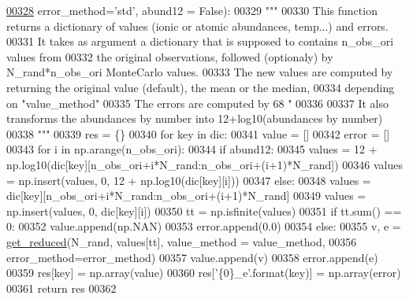 \begin{DoxyCode}
\hypertarget{namespacepyneb_1_1utils_1_1misc_l00328}{}\hyperlink{namespacepyneb_1_1utils_1_1misc_ad6fc4e32ea4c076ac81e99b5c1e74f13}{00328}                     error\_method=\textcolor{stringliteral}{'std'}, abund12 = \textcolor{keyword}{False}):
00329     \textcolor{stringliteral}{"""}
00330 \textcolor{stringliteral}{    This function returns a dictionary of values (ionic or atomic abundances, temp...) and errors.}
00331 \textcolor{stringliteral}{    It takes as argument a dictionary that is supposed to contains n\_obs\_ori values from}
00332 \textcolor{stringliteral}{        the original observations, followed (optionaly) by N\_rand*n\_obs\_ori MonteCarlo values.}
00333 \textcolor{stringliteral}{    The new values are computed by returning the original value (default), the mean or the median, }
00334 \textcolor{stringliteral}{        depending on "value\_method"}
00335 \textcolor{stringliteral}{    The errors are computed by 68%
      "}
00336 \textcolor{stringliteral}{    }
00337 \textcolor{stringliteral}{    It also transforms the abundances by number into 12+log10(abundances by number)}
00338 \textcolor{stringliteral}{    """}
00339     res = \{\}
00340     \textcolor{keywordflow}{for} key \textcolor{keywordflow}{in} dic:
00341         value = []
00342         error = []
00343         \textcolor{keywordflow}{for} i \textcolor{keywordflow}{in} np.arange(n\_obs\_ori):
00344             \textcolor{keywordflow}{if} abund12:
00345                 values = 12 + np.log10(dic[key][n\_obs\_ori+i*N\_rand:n\_obs\_ori+(i+1)*N\_rand])
00346                 values = np.insert(values, 0, 12 + np.log10(dic[key][i]))
00347             \textcolor{keywordflow}{else}:
00348                 values = dic[key][n\_obs\_ori+i*N\_rand:n\_obs\_ori+(i+1)*N\_rand]
00349                 values = np.insert(values, 0, dic[key][i])
00350             tt = np.isfinite(values)
00351             \textcolor{keywordflow}{if} tt.sum() == 0:
00352                 value.append(np.NAN)
00353                 error.append(0.0)
00354             \textcolor{keywordflow}{else}:
00355                 v, e = \hyperlink{namespacepyneb_1_1utils_1_1misc_ae69de9c9e8f8bde114b8edd326f3b993}{get\_reduced}(N\_rand, values[tt], value\_method = value\_method, 
00356                                    error\_method=error\_method)
00357                 value.append(v)
00358                 error.append(e)
00359         res[key] = np.array(value)
00360         res[\textcolor{stringliteral}{'\{0\}\_e'}.format(key)] = np.array(error)
00361     \textcolor{keywordflow}{return} res
00362 
\end{DoxyCode}
\hypertarget{namespacepyneb_1_1utils_1_1misc_aee812eafa08b828b4c65c700a6cf4ff6}{}
